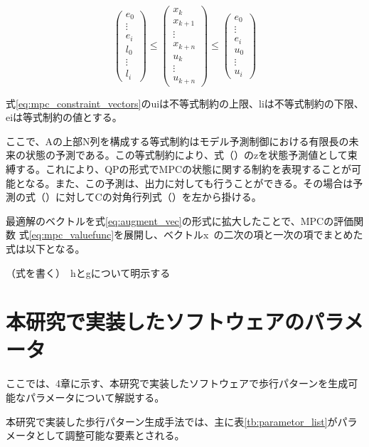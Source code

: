 \begin{equation}
  \begin{pmatrix}
    e_{0}\\
    \vdots \\
    e_{i}\\
    l_{0}\\
    \vdots\\
    l_{i}
  \end{pmatrix}
  \leq
  \begin{pmatrix}
    x_{k} \\ x_{k+1} \\ \vdots \\ x_{k+n}
    \\
    u_{k} \\ \vdots \\ u_{k+n}
  \end{pmatrix}
  \leq
  \begin{pmatrix}
    e_{0}\\
    \vdots\\
    e_{i}\\
    u_{0}\\
    \vdots\\
    u_{i}
  \end{pmatrix}
\end{equation}

式\eqref{eq:mpc_constraint_vectors}のuiは不等式制約の上限、liは不等式制約の下限、eiは等式制約の値とする。

ここで、Aの上部N列を構成する等式制約はモデル予測制御における有限長の未来の状態の予測である。この等式制約により、式（）のzを状態予測値として束縛する。これにより、QPの形式でMPCの状態に関する制約を表現することが可能となる。また、この予測は、出力に対しても行うことができる。その場合は予測の式（）に対してCの対角行列式（）を左から掛ける。

最適解のベクトルを式\eqref{eq:augment_vec}の形式に拡大したことで、MPCの評価関数 式\eqref{eq:mpc_valuefunc}を展開し、ベクトルx~の二次の項と一次の項でまとめた式は以下となる。

（式を書く）　hとgについて明示する


\section{本研究で実装したソフトウェアのパラメータ}

ここでは、4章に示す、本研究で実装したソフトウェアで歩行パターンを生成可能なパラメータについて解説する。

本研究で実装した歩行パターン生成手法では、主に表\ref{tb:parametor_list}がパラメータとして調整可能な要素とされる。

